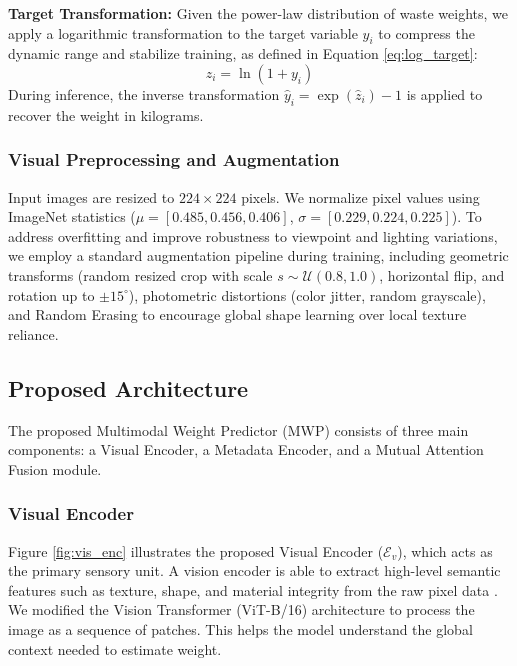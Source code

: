\documentclass[journal,twoside,web]{ieeecolor}
\begin{document}
\textbf{Target Transformation:}
Given the power-law distribution of waste weights, we apply a logarithmic transformation to the target variable $y_i$ to compress the dynamic range and stabilize training, as defined in Equation \eqref{eq:log_target}:
\begin{equation} \label{eq:log_target}
    z_i = \ln(1 + y_i)
\end{equation}
During inference, the inverse transformation $\hat{y}_i = \exp(\hat{z}_i) - 1$ is applied to recover the weight in kilograms.

\subsubsection{Visual Preprocessing and Augmentation}
Input images are resized to $224\times224$ pixels. We normalize pixel values using ImageNet statistics ($\mu=[0.485, 0.456, 0.406]$, $\sigma=[0.229, 0.224, 0.225]$).
To address overfitting and improve robustness to viewpoint and lighting variations, we employ a standard augmentation pipeline during training, including geometric transforms (random resized crop with scale $s \sim \mathcal{U}(0.8, 1.0)$, horizontal flip, and rotation up to $\pm15^\circ$), photometric distortions (color jitter, random grayscale), and Random Erasing \cite{zhong2020random} to encourage global shape learning over local texture reliance.

\subsection{Proposed Architecture}
The proposed Multimodal Weight Predictor (MWP) consists of three main components: a Visual Encoder, a Metadata Encoder, and a Mutual Attention Fusion module.

\subsubsection{Visual Encoder}
Figure \ref{fig:vis_enc} illustrates the proposed Visual Encoder ($\mathcal{E}_v$), which acts as the primary sensory unit. A vision encoder is able to extract high-level semantic features such as texture, shape, and material integrity from the raw pixel data \cite{ahmed2025deepcompress}. We modified the Vision Transformer (ViT-B/16) architecture to process the image as a sequence of patches. This helps the model understand the global context needed to estimate weight.
\end{document}
